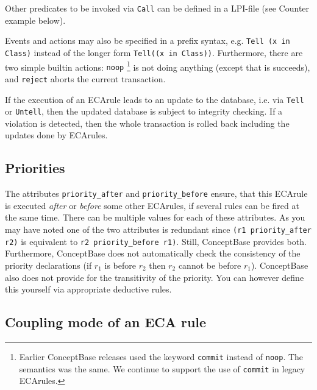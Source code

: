 Other predicates to be invoked via {\tt Call} can be defined in a LPI-file (see Counter example below).

Events and actions may also be specified in a prefix syntax, e.g. 
\verb+Tell (x in Class)+ instead of the longer form \verb+Tell((x in Class))+.
Furthermore, there are two simple builtin actions: {\tt noop}%
\footnote{Earlier ConceptBase releases used the keyword {\tt commit} instead of {\tt noop}.
The semantics was the same. We continue to support the use of {\tt commit}
in legacy ECArules.}
is not doing anything
(except that is succeeds), and {\tt reject} aborts the current transaction.

If the execution of an ECArule leads to an update to the database, i.e. via {\tt Tell}
or {\tt Untell}, then the updated database is subject to integrity checking. If
a violation is detected, then the whole transaction is rolled back including
the updates done by ECArules.

\subsection{Priorities}

The attributes {\tt priority\_after} and {\tt priority\_before}
ensure, that this ECArule is executed {\em after} or {\em before}
some other ECArules, if several rules can be fired at the same
time. There can be multiple values for each of these attributes.
As you may have noted one of the two attributes is redundant since
{\tt (r1 priority\_after r2)} is equivalent to 
{\tt r2 priority\_before r1)}. Still, ConceptBase provides both.
Furthermore, ConceptBase does not automatically check the consistency
of the priority declarations (if $r_1$ is before $r_2$ then $r_2$ cannot
be before $r_1$). ConceptBase also does not provide for the transitivity
of the priority. You can however define this yourself via appropriate deductive
rules.

\subsection{Coupling mode of an ECA rule}

